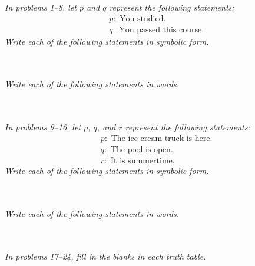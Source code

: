 \begin{exercises}
\emph{In problems 1--8, let $p$ and $q$ represent the following statements:}
\begin{align*}
&p: \textrm{ You studied.}\\
&q: \textrm{ You passed this course.}
\end{align*}
\emph{Write each of the following statements in symbolic form.}


\\ \\

\emph{Write each of the following statements in words.}

\\ \\

\emph{In problems 9--16, let $p$, $q$, and $r$ represent the following statements:}
\begin{align*}
&p: \textrm{ The ice cream truck is here.}\\
&q: \textrm{ The pool is open.}\\
&r: \textrm{ It is summertime.}
\end{align*}
\emph{Write each of the following statements in symbolic form.}


\\ \\

\emph{Write each of the following statements in words.}

\\ \\

\emph{In problems 17--24, fill in the blanks in each truth table.}


\end{exercises}
